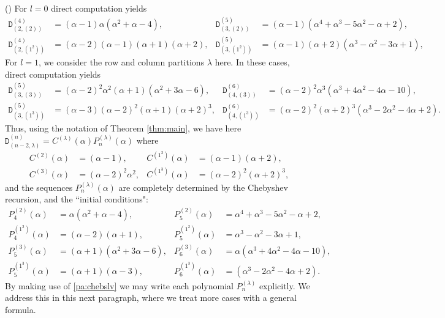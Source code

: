 \documentclass{article}
\newcommand{\ppm}[1]{\textcolor{red}{#1}}
\newcommand{\bajm}[1]{\textcolor{blue}{#1}}
\theoremstyle{definition}
\newcommand{\mdef}{\refstepcounter{theorem}       \medskip \noindent ({\bf \thetheorem}) }
\newcommand{\Deltt}{{\mathtt D}}   %
\newcommand{\Delttt}[2]{\Deltt^{#1}_{(#2)}}  %
\def\a{\alpha}
\def\l{\lambda}
\numberwithin{equation}{subsection}
\begin{document}
\mdef \label{pa:1dgdets}
For $l=0$  %
direct computation yields
\begin{align*}
\Delttt{(4)}{2,(2)}&=(\alpha -1) \alpha  \left(\alpha ^2+\alpha -4\right),& \Delttt{(5)}{3,(2)}&=(\alpha -1) \left(\alpha ^4+\alpha ^3-5 \alpha ^2-\alpha +2\right),\\
    \Delttt{(4)}{2,(1^2)}&=(\alpha -2) (\alpha -1) (\alpha +1) (\alpha +2),&
   \Delttt{(5)}{3,(1^2)}&=(\alpha -1) (\alpha +2) \left(\alpha ^3-\alpha ^2-3 \alpha +1\right),
\end{align*}  
For $l=1$, we consider the row and column partitions $\l$ here. 
In these cases, direct computation yields
\begin{align*}
    \Delttt{(5)}{3,(3)}&=(\alpha -2)^2 \alpha ^2 (\alpha +1) \left(\alpha ^2+3 \alpha -6\right),& \Delttt{(6)}{4,(3)}&=(\alpha -2)^2 \alpha ^3 \left(\alpha ^3+4 \alpha ^2-4 \alpha -10\right),\\
    \Delttt{(5)}{3,(1^3)}&=(\alpha -3) (\alpha -2)^2 (\alpha +1) (\alpha +2)^3,&
    \Delttt{(6)}{4,(1^3)}&=(\alpha -2)^2 (\alpha +2)^3 \left(\alpha ^3-2 \alpha ^2-4 \alpha +2\right).
\end{align*}
Thus, using the notation of Theorem \ref{thm:main}, 
we have here $\Delttt{(n)}{n-2,\l}=C^{(\l)}(\a) P^{(\l)}_{n}(\a)$ where
\begin{align*}
    C^{(2)}(\a)&=(\a-1), &    C^{(1^2)}(\a)&=(\a-1)(\a+2),\\
    C^{(3)}(\a)&=(\a-2)^2\a^2, &    C^{(1^3)}(\a)&=(\a-2)^2(\a+2)^3,
\end{align*}
and the sequences $P_n^{(\l)}(\a)$ are completely determined by the Chebyshev recursion, and the ``initial conditions":
\begin{align*}
    P_4^{(2)}(\a)&=\a(\a^2+\a-4), &        P_5^{(2)}(\a)&=\a^4+\a^3-5\a^2-\a+2,\\
    P_4^{(1^2)}(\a)&=(\a-2)(\a+1), &        P_5^{(1^2)}(\a)&=\alpha ^3-\alpha ^2-3 \alpha +1,\\
    P_5^{(3)}(\a)&=(\alpha +1) \left(\alpha ^2+3 \alpha -6\right), &        P_6^{(3)}(\a)&=\alpha  \left(\alpha ^3+4 \alpha ^2-4 \alpha -10\right),\\
    P_5^{(1^3)}(\a)&=(\alpha +1) \left(\a-3\right), &        P_6^{(1^3)}(\a)&=  \left(\alpha ^3-2 \alpha ^2-4 \alpha +2\right).
\end{align*}
By making use of \ref{pa:chebslv} we may write each polynomial $P_n^{(\l)}$ explicitly. We address this in this next paragraph, where we treat more cases with a general formula.
\end{document}
